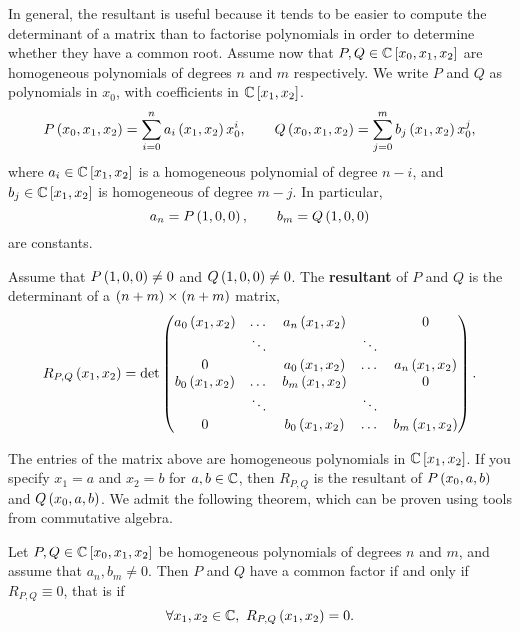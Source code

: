 
In general, the resultant is useful because it tends to be easier to compute the determinant of a matrix than to factorise polynomials in order to determine whether they have a common root. Assume now that $ P, Q \in \mathbb{C}\left[ x_0, x_1, x_2 \right] $ are homogeneous polynomials of degrees $ n $ and $ m $ respectively. We write $ P $ and $ Q $ as polynomials in $ x_0 $, with coefficients in $ \mathbb{C}\left[ x_1, x_2 \right] $.
$$ P\left( x_0, x_1, x_2 \right) = \sum_{i = 0}^n a_i\left( x_1, x_2 \right)x_0^i, \qquad Q\left( x_0, x_1, x_2 \right) = \sum_{j = 0}^m b_j\left( x_1, x_2 \right)x_0^j, $$
where $ a_i \in \mathbb{C}\left[ x_1, x_2 \right] $ is a homogeneous polynomial of degree $ n - i $, and $ b_j \in \mathbb{C}\left[ x_1, x_2 \right] $ is homogeneous of degree $ m - j $. In particular,
$$ a_n = P\left( 1, 0, 0 \right), \qquad b_m = Q\left( 1, 0, 0 \right) $$
are constants.

\begin{definition}
\label{def:9.5}
Assume that $ P\left( 1, 0, 0 \right) \ne 0 $ and $ Q\left( 1, 0, 0 \right) \ne 0 $. The \textbf{resultant} of $ P $ and $ Q $ is the determinant of a $ \left( n + m \right) \times \left( n + m \right) $ matrix,
$$ R_{P, Q}\left( x_1, x_2 \right) = \det
\begin{pmatrix}
a_0\left( x_1, x_2 \right) & \dots & a_n\left( x_1, x_2 \right) & & 0 \\
& \ddots & & \ddots & \\
0 & & a_0\left( x_1, x_2 \right) & \dots & a_n\left( x_1, x_2 \right) \\
b_0\left( x_1, x_2 \right) & \dots & b_m\left( x_1, x_2 \right) & & 0 \\
& \ddots & & \ddots & \\
0 & & b_0\left( x_1, x_2 \right) & \dots & b_m\left( x_1, x_2 \right)
\end{pmatrix}.
$$
\end{definition}

The entries of the matrix above are homogeneous polynomials in $ \mathbb{C}\left[ x_1, x_2 \right] $. If you specify $ x_1 = a $ and $ x_2 = b $ for $ a, b \in \mathbb{C} $, then $ R_{P, Q} $ is the resultant of $ P\left( x_0, a, b \right) $ and $ Q\left( x_0, a, b \right) $. We admit the following theorem, which can be proven using tools from commutative algebra.

\begin{theorem}
\label{thm:9.6}
Let $ P, Q \in \mathbb{C}\left[ x_0, x_1, x_2 \right] $ be homogeneous polynomials of degrees $ n $ and $ m $, and assume that $ a_n, b_m \ne 0 $. Then $ P $ and $ Q $ have a common factor if and only if $ R_{P, Q} \equiv 0 $, that is if
$$ \forall x_1, x_2 \in \mathbb{C}, \ R_{P, Q}\left( x_1, x_2 \right) = 0. $$
\end{theorem}

